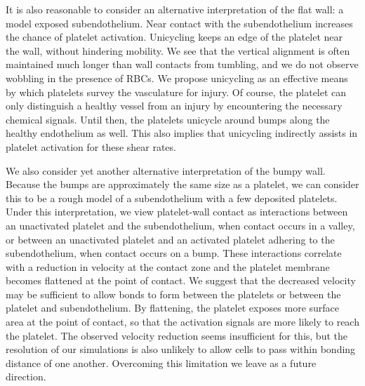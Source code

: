 It is also reasonable to consider an alternative interpretation of the flat wall: a model
exposed subendothelium. Near contact with the subendothelium increases the chance of
platelet activation.  Unicycling keeps an edge of the platelet near the wall, without
hindering mobility. We see that the vertical alignment is often maintained much longer
than wall contacts from tumbling, and we do not observe wobbling in the presence of RBCs.
We propose unicycling as an effective means by which platelets survey the vasculature for
injury. Of course, the platelet can only distinguish a healthy vessel from an injury by
encountering the necessary chemical signals. Until then, the platelets unicycle around
bumps along the healthy endothelium as well. This also implies that unicycling indirectly
assists in platelet activation for these shear rates.

We also consider yet another alternative interpretation of the bumpy wall. Because the
bumps are approximately the same size as a platelet, we can consider this to be a rough
model of a subendothelium with a few deposited platelets. Under this interpretation, we
view platelet-wall contact as interactions between an unactivated platelet and the
subendothelium, when contact occurs in a valley, or between an unactivated platelet and
an activated platelet adhering to the subendothelium, when contact occurs on a bump.
These interactions correlate with a reduction in velocity at the contact zone and the
platelet membrane becomes flattened at the point of contact. We suggest that the
decreased velocity may be sufficient to allow bonds to form between the platelets or
between the platelet and subendothelium. By flattening, the platelet exposes more surface
area at the point of contact, so that the activation signals are more likely to reach the
platelet. The observed velocity reduction seems insufficient for this, but the resolution
of our simulations is also unlikely to allow cells to pass within bonding distance of one
another. Overcoming this limitation we leave as a future direction.

